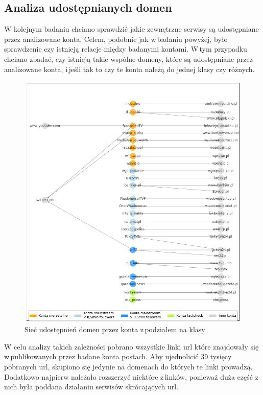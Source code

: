 \subsection{Analiza udostępnianych domen }
W kolejnym badaniu chciano sprawdzić jakie zewnętrzne serwisy są udostępniane przez analizowane konta. Celem, podobnie jak w\,badaniu powyżej, było sprawdzenie czy istnieją relacje między badanymi kontami. W\,tym przypadku chciano zbadać, czy istnieją takie wspólne domeny, które są udostępniane przez analizowane konta, i\,jeśli tak to czy te konta należą do jednej klasy czy różnych.
\begin{figure}[!h]
	\centering \includegraphics[width=1.0\linewidth]{img/results/connectionwithlikns.png}
	\caption{Sieć udostępnień domen przez konta z\,podziałem na klasy} \label{fig:connectedlinks}
\end{figure}
\par



\newpage
W celu analizy takich zależności pobrano wszystkie linki url które znajdowały się w\,publikowanych przez badane konta postach. Aby ujednolicić 39 tysięcy pobranych url, skupiono się jedynie na domenach do których te linki prowadzą. Dodatkowo najpierw należało rozszerzyć niektóre z\,linków, ponieważ duża część z\,nich była poddana działaniu serwisów skrócających url. 


